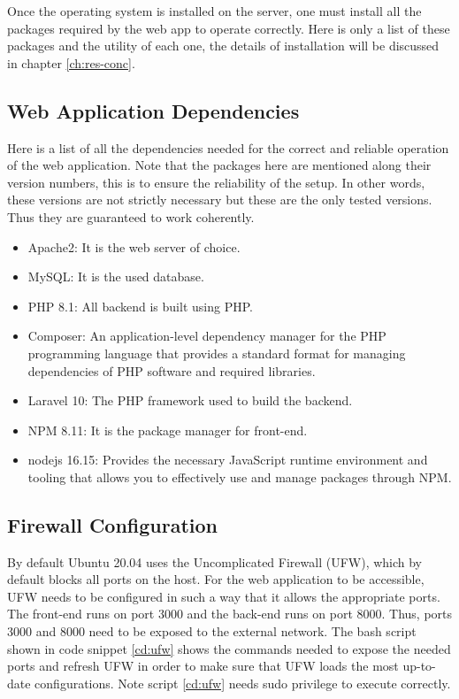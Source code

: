 Once the operating system is installed on the server, one must install all the packages required by the web app to operate correctly. Here is only a list of these packages and the utility of each one, the details of installation will be discussed in chapter \ref{ch:res-conc}.
\subsection{Web Application Dependencies}
Here is a list of all the dependencies needed for the correct and reliable operation of the web application. Note that the packages here are mentioned along their version numbers, this is to ensure the reliability of the setup. In other words, these versions are not strictly necessary but these are the only tested versions. Thus they are guaranteed to work coherently.

\begin{itemize}
    \item Apache2: It is the web server of choice.
    \item MySQL: It is the used database.
    \item PHP 8.1: All backend is built using PHP.
    \item Composer: An application-level dependency manager for the PHP programming language that provides a standard format for managing dependencies of PHP software and required libraries.
    \item Laravel 10: The PHP framework used to build the backend.
    \item NPM 8.11: It is the package manager for front-end.
    \item nodejs 16.15: Provides the necessary JavaScript runtime environment and tooling that allows you to effectively use and manage packages through NPM.
\end{itemize}

\subsection{Firewall Configuration}
By default Ubuntu 20.04 uses the Uncomplicated Firewall (UFW)\cite{ubuntu-ufw}, which by default blocks all ports on the host. For the web application to be accessible, UFW needs to be configured in such a way that it allows the appropriate ports. The front-end runs on port 3000 and the back-end runs on port 8000. Thus, ports 3000 and 8000 need to be exposed to the external network. The bash script shown in code snippet \ref{cd:ufw} shows the commands needed to expose the needed ports and refresh UFW in order to make sure that UFW loads the most up-to-date configurations. Note script \ref{cd:ufw} needs sudo privilege to execute correctly.


